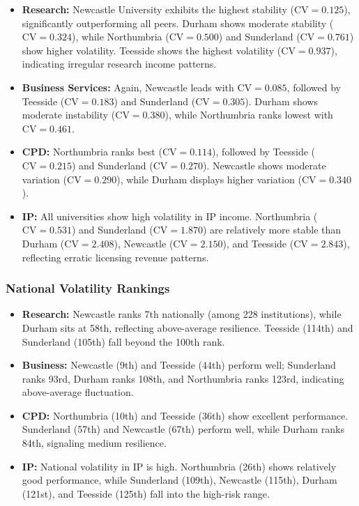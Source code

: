 \documentclass[journal,onecolumn, 10pt,draftclsnofoot]{IEEEtran}
\begin{document}
\begin{itemize}
    \item \textbf{Research:} Newcastle University exhibits the highest stability ($\mathrm{CV}=0.125$), significantly outperforming all peers. Durham shows moderate stability ($\mathrm{CV}=0.324$), while Northumbria ($\mathrm{CV}=0.500$) and Sunderland ($\mathrm{CV}=0.761$) show higher volatility. Teesside shows the highest volatility ($\mathrm{CV}=0.937$), indicating irregular research income patterns.
    
    \item \textbf{Business Services:} Again, Newcastle leads with $\mathrm{CV}=0.085$, followed by Teesside ($\mathrm{CV}=0.183$) and Sunderland ($\mathrm{CV}=0.305$). Durham shows moderate instability ($\mathrm{CV}=0.380$), while Northumbria ranks lowest with $\mathrm{CV}=0.461$.
    
    \item \textbf{CPD:} Northumbria ranks best ($\mathrm{CV}=0.114$), followed by Teesside ($\mathrm{CV}=0.215$) and Sunderland ($\mathrm{CV}=0.270$). Newcastle shows moderate variation ($\mathrm{CV}=0.290$), while Durham displays higher variation ($\mathrm{CV}=0.340$).
    
    \item \textbf{IP:} All universities show high volatility in IP income. Northumbria ($\mathrm{CV}=0.531$) and Sunderland ($\mathrm{CV}=1.870$) are relatively more stable than Durham ($\mathrm{CV}=2.408$), Newcastle ($\mathrm{CV}=2.150$), and Teesside ($\mathrm{CV}=2.843$), reflecting erratic licensing revenue patterns.
\end{itemize}

\subsubsection{National Volatility Rankings}

\begin{itemize}
    \item \textbf{Research:} Newcastle ranks 7th nationally (among 228 institutions), while Durham sits at 58th, reflecting above-average resilience. Teesside (114th) and Sunderland (105th) fall beyond the 100th rank.
    
    \item \textbf{Business:} Newcastle (9th) and Teesside (44th) perform well; Sunderland ranks 93rd, Durham ranks 108th, and Northumbria ranks 123rd, indicating above-average fluctuation.
    
    \item \textbf{CPD:} Northumbria (10th) and Teesside (36th) show excellent performance. Sunderland (57th) and Newcastle (67th) perform well, while Durham ranks 84th, signaling medium resilience.
    
    \item \textbf{IP:} National volatility in IP is high. Northumbria (26th) shows relatively good performance, while Sunderland (109th), Newcastle (115th), Durham (121st), and Teesside (125th) fall into the high-risk range.
\end{itemize}
\end{document}
